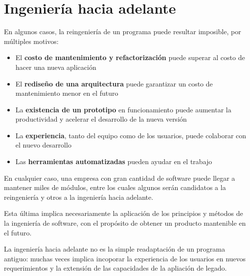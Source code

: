 \section{Ingeniería hacia adelante}

En algunos casos, 
la reingeniería de un programa puede resultar imposible,
por múltiples motivos:
\begin{itemize}
    \item El \textbf{costo de mantenimiento y refactorización} 
    puede superar al costo de hacer una nueva aplicación
    \item El \textbf{rediseño de una arquitectura} puede garantizar un costo 
    de mantenimiento menor en el futuro
    \item La \textbf{existencia de un prototipo} en funcionamiento puede 
    aumentar la productividad y acelerar el desarrollo de la nueva versión
    \item La \textbf{experiencia}, tanto del equipo como de los usuarios,
    puede colaborar con el nuevo desarrollo 
    \item Las \textbf{herramientas automatizadas} pueden ayudar en el trabajo
\end{itemize}

En cualquier caso,
una empresa con gran cantidad de software puede llegar a mantener miles de 
módulos,
entre los cuales algunos serán candidatos a la reingeniería y otros a la 
ingeniería hacia adelante. 

Esta última implica necesariamente la aplicación de los principios y 
métodos de la ingeniería de software, con el propósito de obtener un producto 
mantenible en el futuro.

La ingeniería hacia adelante no es la simple readaptación de un programa antiguo:
muchas veces implica incoporar la experiencia de los usuarios 
en nuevos requerimientos y 
la extensión de las capacidades de la apliación de legado.